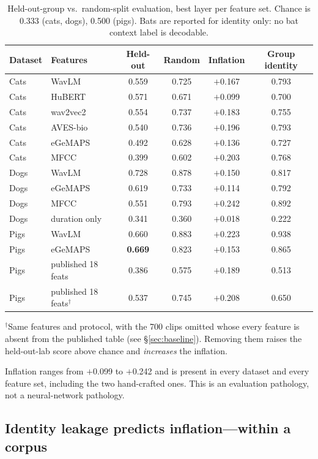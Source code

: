 \documentclass{article}
\begin{document}
\begin{table}[t]
\caption{Held-out-group vs.\ random-split evaluation, best layer per feature set. Chance is 0.333
(cats, dogs), 0.500 (pigs). Bats are reported for identity only: no bat context label is decodable.}
\label{tab:audit}
\centering\small
\begin{tabular}{llcccc}
\toprule
Dataset & Features & Held-out & Random & Inflation & Group identity \\
\midrule
Cats & WavLM & 0.559 & 0.725 & $+$0.167 & 0.793 \\
Cats & HuBERT & 0.571 & 0.671 & $+$0.099 & 0.700 \\
Cats & wav2vec2 & 0.554 & 0.737 & $+$0.183 & 0.755 \\
Cats & AVES-bio & 0.540 & 0.736 & $+$0.196 & 0.793 \\
Cats & eGeMAPS & 0.492 & 0.628 & $+$0.136 & 0.727 \\
Cats & MFCC & 0.399 & 0.602 & $+$0.203 & 0.768 \\
\midrule
Dogs & WavLM & 0.728 & 0.878 & $+$0.150 & 0.817 \\
Dogs & eGeMAPS & 0.619 & 0.733 & $+$0.114 & 0.792 \\
Dogs & MFCC & 0.551 & 0.793 & $+$0.242 & 0.892 \\
Dogs & duration only & 0.341 & 0.360 & $+$0.018 & 0.222 \\
\midrule
Pigs & WavLM & 0.660 & 0.883 & $+$0.223 & 0.938 \\
Pigs & eGeMAPS & \textbf{0.669} & 0.823 & $+$0.153 & 0.865 \\
Pigs & published 18 feats & 0.386 & 0.575 & $+$0.189 & 0.513 \\
Pigs & published 18 feats$^{\dagger}$ & 0.537 & 0.745 & $+$0.208 & 0.650 \\
\bottomrule
\end{tabular}

\vspace{2pt}
{\footnotesize $^{\dagger}$Same features and protocol, with the 700 clips omitted whose every
feature is absent from the published table (see \S\ref{sec:baseline}). Removing them raises the
held-out-lab score above chance and \emph{increases} the inflation.}
\end{table}

Inflation ranges from $+$0.099 to $+$0.242 and is present in every dataset and every feature set,
including the two hand-crafted ones. This is an evaluation pathology, not a neural-network pathology.

\subsection{Identity leakage predicts inflation---within a corpus}
\end{document}
